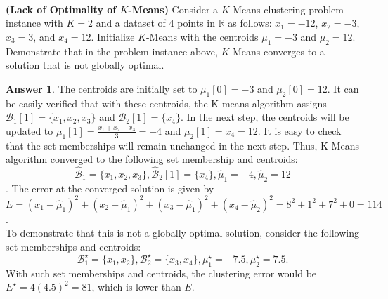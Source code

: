 \documentclass{article}
\title{\vspace{-2.5cm}\textbf{\coursefullname}\\\hatypeandnun\\\haname}
\date{}
\theoremstyle{definition}
\newtheorem*{answer}{Answer}
\begin{document}
\maketitle
\vspace*{-2cm}
\begin{question}[start=1]
	\item \textbf{(Lack of Optimality of $K$-Means)} Consider a $K$-Means clustering problem instance with $K = 2$ and a dataset of $4$ points in $\mathbb{R}$ as follows: $x_1 = -12$, $x_2 = -3$, $x_3 = 3$, and $x_4 = 12$. Initialize $K$-Means with the centroids $\mu_1 = -3$ and $\mu_2 = 12$. Demonstrate that in the problem instance above, $K$-Means converges to a solution that is not globally optimal.
	\begin{answer}
		The centroids are initially set to $\mu_1[0] = -3$ and $\mu_2[0] = 12$. It can be easily verified that with these centroids, the K-means algorithm assigns $\mathcal{B}_1[1] = \{x_1, x_2, x_3\}$ and $\mathcal{B}_2[1] = \{x_4\}$. In the next step, the centroids will be updated to $\mu_1[1] = \frac{x_1 + x_2 + x_3}{3} = -4$ and $\mu_2[1] = x_4=12$. It is easy to check that the set memberships will remain unchanged in the next step. Thus, K-Means algorithm converged to the following set membership and centroids: $$\hat{\mathcal{B}}_1 = \{x_1, x_2, x_3\}, \hat{\mathcal{B}}_2[1] = \{x_4\}, \hat{\mu}_1 =-4, \hat{\mu}_2 = 12$$. The error at the converged solution is given by $E = (x_1 - \hat{\mu}_1)^2 + (x_2 - \hat{\mu}_1)^2 + (x_3 - \hat{\mu}_1)^2 + (x_4 - \hat{\mu}_2)^2 = 8^2 + 1^2 + 7^2 + 0 = 114$.\\
		
		To demonstrate that this is not a globally optimal solution, consider the following set memberships and centroids: $$\mathcal{B}^\star_1 = \{x_1, x_2\}, \mathcal{B}^\star_2 = \{x_3, x_4\}, \mu^\star_1 = -7.5, \mu^\star_2 = 7.5.$$ With such set memberships and centroids, the clustering error would be $E^\star = 4(4.5)^2 = 81$, which is lower than $E$.
	\end{answer}
	

\end{question}
\end{document}
